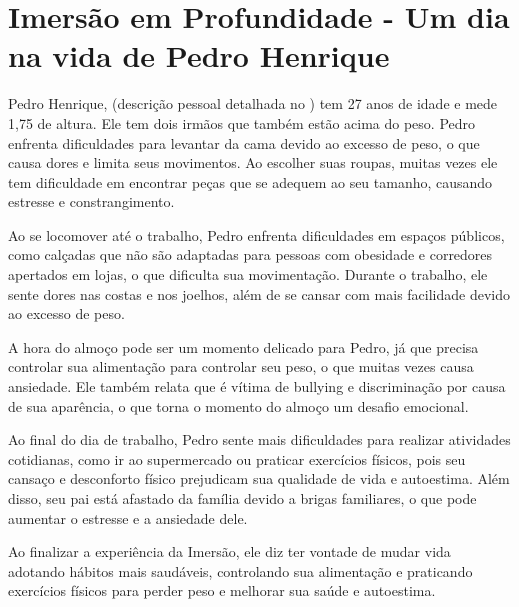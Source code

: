 \documentclass[
	12pt,				%
	oneside,   	        %
	a4paper,			%
	chapter=TITLE,		%
	section=TITLE,		%
	subsection=TITLE,	%
	subsubsection=TITLE,%
	english,			%
	french,				%
	spanish,			%
	brazil,				%
	]{pacotes/abntex2}
\begin{document}
\section{\textbf{Imersão em Profundidade - Um dia na vida de Pedro Henrique}}
\label{sec:imersaoprofunda}

Pedro Henrique, (descrição pessoal detalhada no ) \cite{Pedro} tem 27 anos de idade e mede 1,75 de altura. Ele tem dois irmãos que também estão acima do peso. Pedro enfrenta dificuldades para levantar da cama devido ao excesso de peso, o que causa dores e limita seus movimentos. Ao escolher suas roupas, muitas vezes ele tem dificuldade em encontrar peças que se adequem ao seu tamanho, causando estresse e constrangimento.

Ao se locomover até o trabalho, Pedro enfrenta dificuldades em espaços públicos, como calçadas que não são adaptadas para pessoas com obesidade e corredores apertados em lojas, o que dificulta sua movimentação. Durante o trabalho, ele sente dores nas costas e nos joelhos, além de se cansar com mais facilidade devido ao excesso de peso.

A hora do almoço pode ser um momento delicado para Pedro, já que precisa controlar sua alimentação para controlar seu peso, o que muitas vezes causa ansiedade. Ele também relata que é vítima de bullying e discriminação por causa de sua aparência, o que torna o momento do almoço um desafio emocional.

Ao final do dia de trabalho, Pedro sente mais dificuldades para realizar atividades cotidianas, como ir ao supermercado ou praticar exercícios físicos, pois seu cansaço e desconforto físico prejudicam sua qualidade de vida e autoestima. Além disso, seu pai está afastado da família devido a brigas familiares, o que pode aumentar o estresse e a ansiedade dele.

Ao finalizar a experiência da Imersão, ele diz ter vontade de mudar vida adotando hábitos mais saudáveis, controlando sua alimentação e praticando exercícios físicos para perder peso e melhorar sua saúde e autoestima.

\newpage
\postextual
\renewcommand{\bibsection}{%
\section{\bibname}
\bibmark
\prebibhook}
\end{document}
